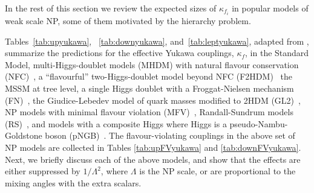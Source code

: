 \documentclass[../report.tex]{subfiles}
\begin{document}
In the rest of this section we review the expected sizes of $\kappa_{f_i}$
in popular models of weak scale NP, some of them motivated by the
hierarchy problem. 

\label{subsubsec:np-models}
Tables~\ref{tab:upyukawa}, ~\ref{tab:downyukawa},
and~\ref{tab:leptyukawa}, adapted from
\cite{Bishara:2015cha,Dery:2014kxa,Dery:2013aba,Dery:2013rta,Bauer:2015kzy},
summarize the predictions for the effective Yukawa couplings,
$\kappa_f$, in the Standard Model, multi-Higgs-doublet models
(MHDM) with natural flavour conservation (NFC)~\cite{Glashow:1976nt,
  Paschos:1976ay}, a ``flavourful'' two-Higgs-doublet model beyond NFC
(F2HDM)~\cite{Altmannshofer:2015esa, Altmannshofer:2016zrn, 
Altmannshofer:2017uvs, Altmannshofer:2018bch} the MSSM at tree level, 
a single Higgs doublet with
a Froggat-Nielsen mechanism (FN)~\cite{Froggatt:1978nt}, the
Giudice-Lebedev model of quark masses modified to 2HDM
(GL2)~\cite{Giudice:2008uua}, NP models with minimal flavour violation
(MFV)~\cite{D'Ambrosio:2002ex}, Randall-Sundrum models
(RS)~\cite{Randall:1999ee}, and models with a composite Higgs where
Higgs is a pseudo-Nambu-Goldstone boson (pNGB)~\cite{Dugan:1984hq,
  Georgi:1984ef, Kaplan:1983sm, Kaplan:1983fs}. The flavour-violating
couplings in the above set of NP models are collected in Tables
\ref{tab:upFVyukawa} and \ref{tab:downFVyukawa}. Next, we briefly
discuss each of the above models, and show that the effects are either
suppressed by $1/\Lambda^2$, where $\Lambda$ is the NP scale, or are
proportional to the mixing angles with the extra scalars.
\end{document}
